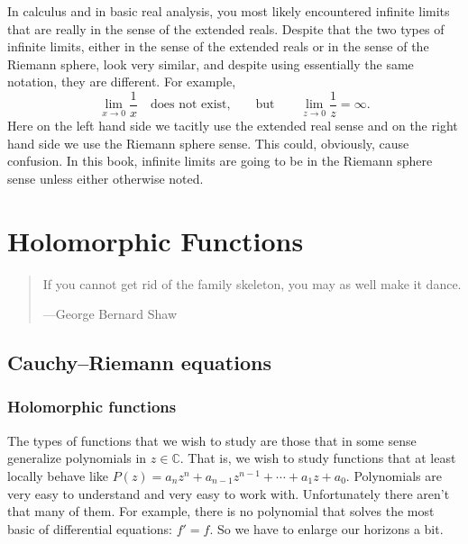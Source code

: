 \documentclass[12pt,openany]{book}
\newcommand{\C}{{\mathbb{C}}}
\theoremstyle{plain}
\theoremstyle{remark}
\theoremstyle{definition}
\newenvironment{myquote}{%
    \begin{quote}%
    \begingroup\itshape
}{%
    \endgroup%
    \end{quote}
}
\theoremstyle{exercise}
\theoremstyle{example}
\begin{document}
In calculus and in basic real analysis, you most likely encountered
infinite limits that are really in the sense of the extended reals.
Despite that the two types of infinite limits, either in the sense of the
extended reals or in the sense of the Riemann sphere,
look very similar, and despite using essentially the same notation,
they are different.
For example,
\begin{equation*}
\lim_{x \to 0} \frac{1}{x} \quad \text{does not exist,} \qquad \text{but} \qquad
\lim_{z \to 0} \frac{1}{z} = \infty .
\end{equation*}
Here on the left hand side we tacitly use the extended real sense and on the
right hand side we use the Riemann sphere sense.
This could, obviously, cause confusion.
In this book, infinite limits are going to be in the Riemann sphere sense
unless either otherwise noted.


\chapter{Holomorphic Functions} \label{ch:holfusc}

\begin{myquote}
If you cannot get rid of the family skeleton, you may as well make it
dance.

---George Bernard Shaw
\end{myquote}


\section{Cauchy--Riemann equations}
\label{sec:holfuncs}

\subsection{Holomorphic functions}

The types of functions that we wish to study are those that in some sense
generalize polynomials in $z \in \C$.  That is, we wish to study functions that 
at least locally behave like $P(z) = a_n z^n + a_{n-1} z^{n-1} + \cdots +
a_1 z + a_0$.  Polynomials are very easy to understand and very easy to work
with.  Unfortunately there aren't that many of them.  For example, there is
no polynomial that solves the most basic of differential equations: $f' =
f$.  So we have to enlarge our horizons a bit.
\end{document}
